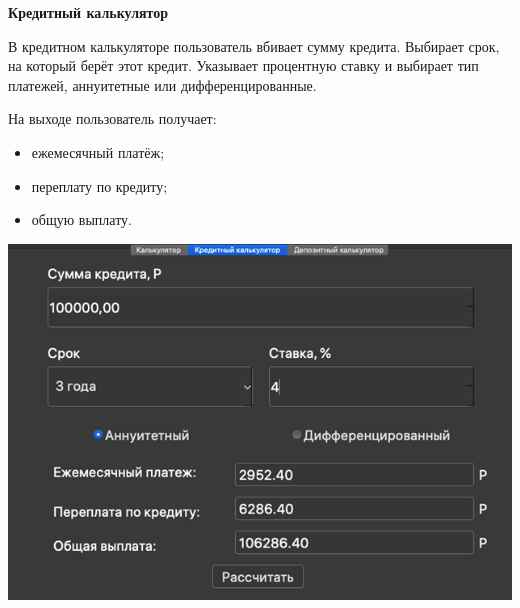 \documentclass[]{article}
\begin{document}
\pagebreak[25]

\huge
\textbf{Кредитный калькулятор}
\newline

\LARGE
В кредитном калькуляторе пользователь вбивает сумму кредита. Выбирает
срок, на который берёт этот кредит. Указывает процентную ставку и
выбирает тип платежей, аннуитетные или дифференцированные.

На выходе пользователь получает:

\begin{itemize}
\item
  ежемесячный платёж;
\item
  переплату по кредиту;
\item
  общую выплату.
\end{itemize}

\includegraphics[bb=0 0 700 450]{media/image4.png}
\end{document}
